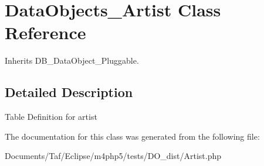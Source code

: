 \hypertarget{classDataObjects__Artist}{
\section{DataObjects\_\-Artist Class Reference}
\label{classDataObjects__Artist}
}
Inherits DB\_\-DataObject\_\-Pluggable.



\subsection{Detailed Description}
Table Definition for artist 

The documentation for this class was generated from the following file:\begin{CompactItemize}
\item 
Documents/Taf/Eclipse/m4php5/tests/DO\_\-dist/Artist.php\end{CompactItemize}
